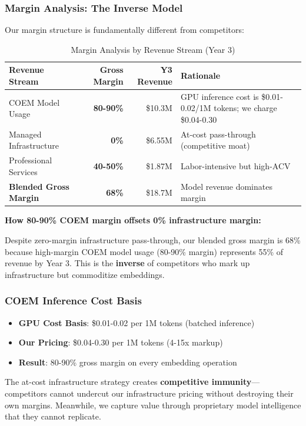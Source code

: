 \subsubsection{Margin Analysis: The Inverse Model}

Our margin structure is fundamentally different from competitors:

\begin{table}[ht]
\centering
\small
\begin{tabular}{|l|r|r|p{5cm}|}
\hline
\textbf{Revenue Stream} & \textbf{Gross Margin} & \textbf{Y3 Revenue} & \textbf{Rationale} \\
\hline
COEM Model Usage & \textbf{80-90\%} & \$10.3M & GPU inference cost is \$0.01-0.02/1M tokens; we charge \$0.04-0.30 \\
\hline
Managed Infrastructure & \textbf{0\%} & \$6.55M & At-cost pass-through (competitive moat) \\
\hline
Professional Services & \textbf{40-50\%} & \$1.87M & Labor-intensive but high-ACV \\
\hline
\textbf{Blended Gross Margin} & \textbf{68\%} & \$18.7M & Model revenue dominates margin \\
\hline
\end{tabular}
\caption{Margin Analysis by Revenue Stream (Year 3)}
\end{table}

\textbf{How 80-90\% COEM margin offsets 0\% infrastructure margin:}

Despite zero-margin infrastructure pass-through, our blended gross margin is 68\% because high-margin COEM model usage (80-90\% margin) represents 55\% of revenue by Year 3. This is the \textbf{inverse} of competitors who mark up infrastructure but commoditize embeddings.


\subsubsection{COEM Inference Cost Basis}

\begin{itemize}[noitemsep]
    \item \textbf{GPU Cost Basis}: \$0.01-0.02 per 1M tokens (batched inference)
    \item \textbf{Our Pricing}: \$0.04-0.30 per 1M tokens (4-15x markup)
    \item \textbf{Result}: 80-90\% gross margin on every embedding operation
\end{itemize}

The at-cost infrastructure strategy creates \textbf{competitive immunity}—competitors cannot undercut our infrastructure pricing without destroying their own margins. Meanwhile, we capture value through proprietary model intelligence that they cannot replicate.

